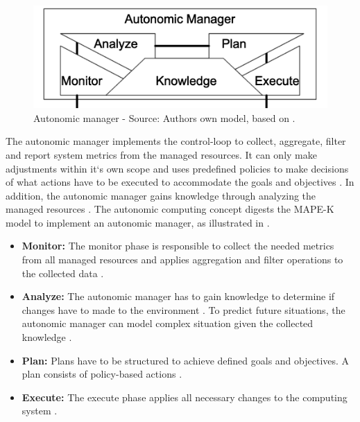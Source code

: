 \begin{figure}[h]
\centering
\includegraphics[scale=1]{images/04_technical_background/ac_autonomic_manager}
\caption{Autonomic manager - Source: Authors own model, based on \cite{Jacob2004AutonomicSolution}.}
\label{fig:ac_manager}
\end{figure}

The autonomic manager implements the control-loop to collect, aggregate, filter and report system metrics from the managed resources. It can only make adjustments within it`s own scope and uses predefined policies to make decisions of what actions have to be executed to accommodate the goals and objectives \cite{Murch2004Autonomic, Sinreich2006AnAB}.
In addition, the autonomic manager gains knowledge through analyzing the managed resources \cite{Murch2004Autonomic}.
The autonomic computing concept digests the MAPE-K model to implement an autonomic manager, as illustrated in  \cite{Goscinski2011CloudComputing}.

\begin{itemize}
\item \textbf{Monitor:}
The monitor phase is responsible to collect the needed metrics from all managed resources and applies aggregation and filter operations to the collected data \cite{Sinreich2006AnAB}.

\item \textbf{Analyze:}
The autonomic manager has to gain knowledge to determine if changes have to made to the environment \cite{Sinreich2006AnAB}. To predict future situations, the autonomic manager can model complex situation given the collected knowledge \cite{Jacob2004AutonomicSolution}.

\item \textbf{Plan:}
Plans have to be structured to achieve defined goals and objectives. A plan consists of policy-based actions \cite{Jacob2004AutonomicSolution, Sinreich2006AnAB}.

\item \textbf{Execute:}
The execute phase applies all necessary changes to the computing system \cite{Sinreich2006AnAB}.
\end{itemize}

